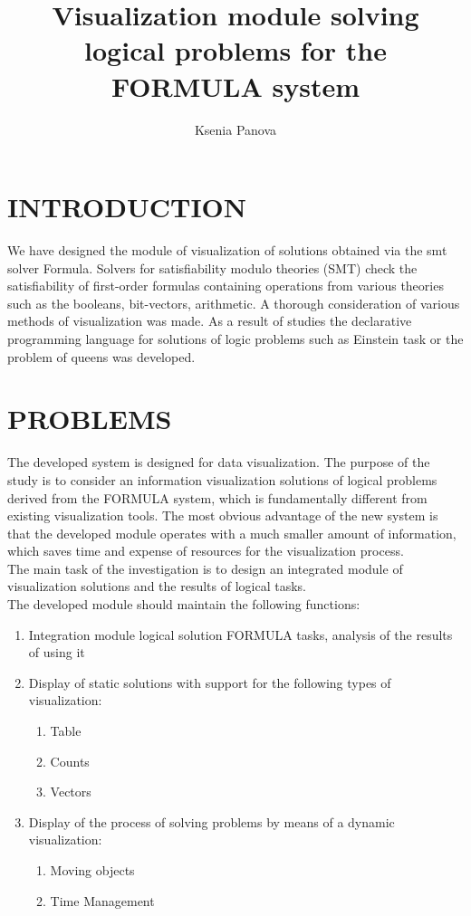 \documentclass[a4paper, 10pt, conference]{ieeeconf}
\title{\LARGE \bf
Visualization module solving logical problems for the FORMULA system
}
\author{Ksenia Panova%
}
\begin{document}
\maketitle
\thispagestyle{empty}
\pagestyle{empty}





\section{INTRODUCTION}

We have designed the module of visualization of solutions obtained via the smt solver Formula. Solvers for satisfiability modulo theories (SMT) check the satisfiability of first-order formulas containing operations from various theories such as the booleans, bit-vectors, arithmetic. A thorough consideration of various methods of visualization was made. As a result of studies the declarative programming language for solutions of logic problems such as Einstein task or the problem of queens was developed.

\section{PROBLEMS}
The developed system is designed for data visualization. The purpose of the study is to consider an information visualization solutions of logical problems derived from the FORMULA system, which is fundamentally different from existing visualization tools. The most obvious advantage of the new system is that the developed module operates with a much smaller amount of information, which saves time and expense of resources for the visualization process.\\
The main task of the investigation is to design an integrated module of visualization solutions and the results of logical tasks.\\
The developed module should maintain the following functions:
\begin{enumerate}
\item Integration module logical solution FORMULA tasks, analysis of the results of using it
\item Display of static solutions with support for the following types of visualization:
\begin{enumerate}
\item Table
\item Counts
\item Vectors
\end{enumerate}
\item Display of the process of solving problems by means of a dynamic visualization:
\begin{enumerate}
\item Moving objects
\item Time Management
\end{enumerate}
\end{enumerate}
\end{document}
